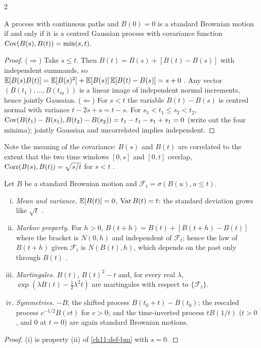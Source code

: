 \begin{paracol}{2}
\begin{proposition}\label{ch11:prop-gauss}
A process with continuous paths and $B(0)=0$ is a standard Brownian motion if and only if it is a centred Gaussian process
with covariance function $\operatorname{Cov}(B(s),B(t))=\min(s,t)$.
\end{proposition}
\begin{proof}
($\Rightarrow$) Take $s\le t$. Then $B(t)=B(s)+[B(t)-B(s)]$ with independent summands, so
$\mathbb{E}[B(s)B(t)]=\mathbb{E}[B(s)^2]+\mathbb{E}[B(s)]\,\mathbb{E}[B(t)-B(s)]=s+0$ . Any vector $(B(t_1),\dots,B(t_m))$ is a linear
image of independent normal increments, hence jointly Gaussian.
($\Leftarrow$) For $s<t$ the variable $B(t)-B(s)$ is centred normal with variance $t-2s+s=t-s$. For
$s_1<t_1\le s_2<t_2$, $\operatorname{Cov}(B(t_1)-B(s_1),B(t_2)-B(s_2))=t_1-t_1-s_1+s_1=0$ (write out the four
minima); jointly Gaussian and uncorrelated implies independent.
\end{proof}
Note the meaning of the covariance: $B(s)$ and $B(t)$ are correlated to the extent that the two time windows $[0,s]$ and $[0,t]$
overlap, $\operatorname{Corr}(B(s),B(t))=\sqrt{s/t}$ for $s<t$ .

\begin{proposition}\label{ch11:prop-elem}
Let $B$ be a standard Brownian motion and $\mathcal F_t=\sigma(B(u),u\le t)$.
\begin{enumerate}[(i)]
  \item \emph{Mean and variance.} $\mathbb{E}[B(t)]=0$, $\operatorname{Var} B(t)=t$: the standard deviation grows like $\sqrt t$
        .
  \item \emph{Markov property.} For $h>0$, $B(t+h)=B(t)+[B(t+h)-B(t)]$ where the bracket is $N(0,h)$ and independent of
        $\mathcal F_t$; hence the law of $B(t+h)$ given $\mathcal F_t$ is $N(B(t),h)$, which depends on the past only through $B(t)$
        .
  \item \emph{Martingales.} $B(t)$, $B(t)^2-t$ and, for every real $\lambda$, $\exp(\lambda B(t)-\tfrac12\lambda^2t)$ are
        martingales with respect to $\{\mathcal F_t\}$.
  \item \emph{Symmetries.} $-B$; the shifted process $B(t_0+t)-B(t_0)$; the rescaled process $c^{-1/2}B(ct)$ for $c>0$; and the
        time-inverted process $tB(1/t)$ ($t>0$, and $0$ at $t=0$) are again standard Brownian motions.
\end{enumerate}
\end{proposition}
\begin{proof}
(i) is property (ii) of \cref{ch11:def-bm} with $s=0$.


\end{proof}
\end{paracol}
